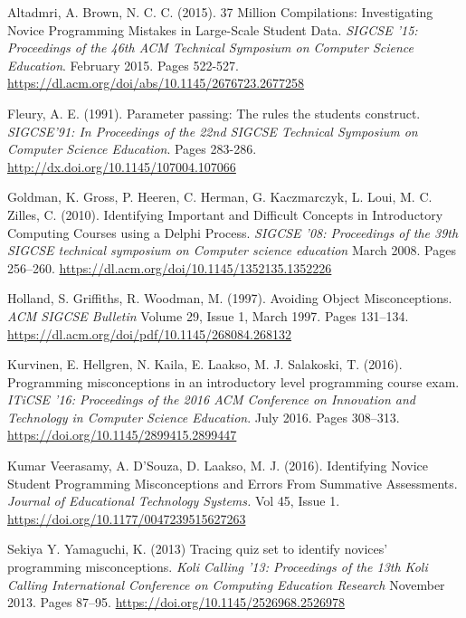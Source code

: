 \documentclass[twocolumn]{article}
\begin{document}
\begin{thebibliography}{9}

Altadmri, A. Brown, N. C. C. (2015). 37 Million Compilations: Investigating Novice Programming Mistakes in Large-Scale Student Data. \emph{SIGCSE '15: Proceedings of the 46th ACM Technical Symposium on Computer Science Education}. February 2015. Pages 522-527.
\url{https://dl.acm.org/doi/abs/10.1145/2676723.2677258}

Fleury, A. E. (1991). Parameter passing: The rules the students construct. \emph{SIGCSE’91:  In Proceedings of the 22nd SIGCSE Technical Symposium on Computer Science Education}. Pages 283-286.
\url{http://dx.doi.org/10.1145/107004.107066}

Goldman, K. Gross, P. Heeren, C. Herman, G. Kaczmarczyk, L. Loui, M. C. Zilles, C. (2010). Identifying Important and Difficult Concepts in Introductory Computing Courses using a Delphi Process. \emph{SIGCSE '08: Proceedings of the 39th SIGCSE technical symposium on Computer science education} March 2008. Pages 256–260.
\url{https://dl.acm.org/doi/10.1145/1352135.1352226} 

Holland, S. Griffiths, R. Woodman, M. (1997). Avoiding Object Misconceptions. \emph{ACM SIGCSE Bulletin} Volume 29, Issue 1, March 1997. Pages 131–134.
\url{https://dl.acm.org/doi/pdf/10.1145/268084.268132} 

Kurvinen, E. Hellgren, N. Kaila, E. Laakso, M. J. Salakoski, T. (2016). Programming misconceptions in an introductory level programming course exam. \emph{ITiCSE '16: Proceedings of the 2016 ACM Conference on Innovation and Technology in Computer Science Education}. July 2016. Pages 308–313. 
\url{https://doi.org/10.1145/2899415.2899447}

Kumar Veerasamy, A. D’Souza, D. Laakso, M. J. (2016). Identifying Novice Student Programming Misconceptions and Errors From Summative Assessments. \emph{Journal of Educational Technology Systems.} Vol 45, Issue 1.  
\url{https://doi.org/10.1177/0047239515627263}

Sekiya Y. Yamaguchi, K. (2013) Tracing quiz set to identify novices' programming misconceptions. \emph{Koli Calling '13: Proceedings of the 13th Koli Calling International Conference on Computing Education Research} November 2013. Pages 87–95.
\url{https://doi.org/10.1145/2526968.2526978} 

\end{thebibliography}
\printbibliography
\end{document}
